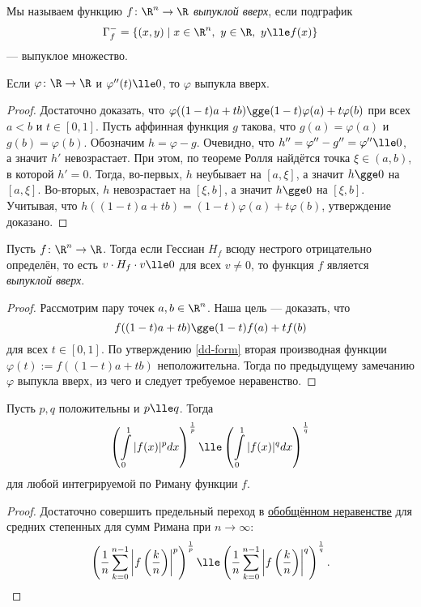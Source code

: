 \documentclass[a4paper, 12pt]{article}
\newcommand{\vf}{\varphi}
\begin{document}
\begin{definition}
    Мы называем функцию \(f \colon \R^n \to \R\) \textit{выпуклой вверх}, если подграфик \[\Gamma_f^- = \{(x, y) \mid x \in \R^n,\ y \in \R,\ y \lle f(x)\}\] --- выпуклое множество.
\end{definition}

\begin{remark}\label{real-conv}
    Если \(\vf \colon \R \to \R\) и \(\vf''(t) \lle 0\), то \(\vf\) выпукла вверх.
\end{remark}
\begin{proof}
    Достаточно доказать, что \(\vf((1-t)a + tb) \gge (1-t)\vf(a) + t\vf(b)\) при всех \(a < b\) и \(t \in [0,1]\). Пусть аффинная функция \(g\) такова, что \(g(a) = \vf(a)\) и \(g(b) = \vf(b)\). Обозначим \(h = \vf - g\). Очевидно, что \(h'' = \vf'' - g'' = \vf'' \lle 0\), а значит \(h'\) невозрастает. При этом, по теореме Ролля найдётся точка \(\xi \in (a,b)\), в которой \(h' = 0\). Тогда, во-первых, \(h\) неубывает на \([a, \xi]\), а значит \(h \gge 0\) на \([a, \xi]\). Во-вторых, \(h\) невозрастает на \([\xi, b]\), а значит \(h \gge 0\) на \([\xi, b]\). Учитывая, что \(h((1-t)a + tb) = (1-t)\vf(a) + t\vf(b)\), утверждение доказано.
\end{proof}

\begin{statement}
    Пусть \(f \colon \R^n \to \R\). Тогда если Гессиан \(H_f\) всюду нестрого отрицательно определён, то есть \(v \cdot H_f \cdot v \lle 0\) для всех \(v \ne 0\), то функция \(f\) является \textit{выпуклой вверх}.
\end{statement}
\begin{proof}
    Рассмотрим пару точек \(a, b \in \R^n\). Наша цель --- доказать, что \[f((1-t)a + tb) \gge (1-t)f(a) + tf(b)\] для всех \(t \in [0,1]\). По утверждению \ref{dd-form} вторая производная функции \(\vf(t) := f((1-t)a + tb)\) неположительна. Тогда по предыдущему замечанию \(\vf\) выпукла вверх, из чего и следует требуемое неравенство.
\end{proof}

\begin{statement}\label{help3}
    Пусть \(p, q\) положительны и \(p \lle q\). Тогда \[\left(\int\limits_0^1 |f(x)|^p dx\right)^{\frac{1}{p}} \lle \left(\int\limits_0^1 |f(x)|^q dx\right)^{\frac{1}{q}}\] для любой интегрируемой по Риману функции \(f\).
\end{statement}
\begin{proof}
    Достаточно совершить предельный переход в \href{https://en.wikipedia.org/wiki/Generalized_mean}{обобщённом неравенстве} для средних степенных для сумм Римана при \(n \to \infty\): \[\left(\frac{1}{n} \sum\limits_{k = 0}^{n-1} \left|f\left(\frac{k}{n}\right)\right|^p \right)^\frac{1}{p} \lle \left(\frac{1}{n} \sum\limits_{k = 0}^{n-1} \left|f\left(\frac{k}{n}\right)\right|^q \right)^\frac{1}{q}.\]
\end{proof}
\end{document}

